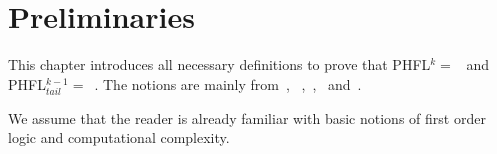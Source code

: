 \chapter{Preliminaries}
\label{ch:preliminaries}
This chapter introduces all necessary definitions to prove that PHFL$^k =$~ and
PHFL$^{k-1}_{tail} =$~. The notions are mainly from~\cite{immerman1999descriptive},
~\cite{papadimitriou1994complexity},~\cite{otto1999bisimulation},~\cite{freireMartins2011descriptive}
and~\cite{lange2014capturing}.

We assume that the reader is already familiar with basic notions of first order logic and computational complexity.







